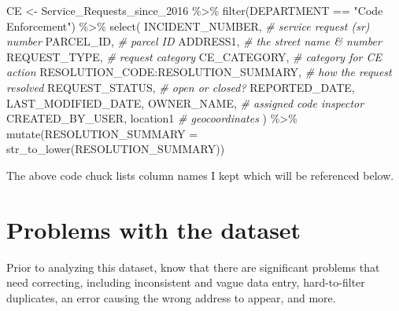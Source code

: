 \documentclass[
]{book}
\newenvironment{Shaded}{\begin{snugshade}}{\end{snugshade}}
\newcommand{\AttributeTok}[1]{\textcolor[rgb]{0.77,0.63,0.00}{#1}}
\newcommand{\CommentTok}[1]{\textcolor[rgb]{0.56,0.35,0.01}{\textit{#1}}}
\newcommand{\FunctionTok}[1]{\textcolor[rgb]{0.00,0.00,0.00}{#1}}
\newcommand{\NormalTok}[1]{#1}
\newcommand{\OtherTok}[1]{\textcolor[rgb]{0.56,0.35,0.01}{#1}}
\newcommand{\SpecialCharTok}[1]{\textcolor[rgb]{0.00,0.00,0.00}{#1}}
\newcommand{\StringTok}[1]{\textcolor[rgb]{0.31,0.60,0.02}{#1}}
\begin{document}
\begin{Shaded}
\begin{Highlighting}[]
\NormalTok{CE }\OtherTok{\textless{}{-}}\NormalTok{ Service\_Requests\_since\_2016 }\SpecialCharTok{\%\textgreater{}\%}
  \FunctionTok{filter}\NormalTok{(DEPARTMENT }\SpecialCharTok{==} \StringTok{"Code Enforcement"}\NormalTok{) }\SpecialCharTok{\%\textgreater{}\%}
  \FunctionTok{select}\NormalTok{(}
\NormalTok{    INCIDENT\_NUMBER, }\CommentTok{\#\textquotesingle{} service request (sr) number}
\NormalTok{    PARCEL\_ID, }\CommentTok{\#\textquotesingle{} parcel ID}
\NormalTok{    ADDRESS1, }\CommentTok{\#\textquotesingle{} the street name \& number}
\NormalTok{    REQUEST\_TYPE, }\CommentTok{\#\textquotesingle{} request category}
\NormalTok{    CE\_CATEGORY, }\CommentTok{\#\textquotesingle{} category for CE action}
\NormalTok{    RESOLUTION\_CODE}\SpecialCharTok{:}\NormalTok{RESOLUTION\_SUMMARY, }\CommentTok{\#\textquotesingle{} how the request resolved}
\NormalTok{    REQUEST\_STATUS, }\CommentTok{\#\textquotesingle{} open or closed?}
\NormalTok{    REPORTED\_DATE, }
\NormalTok{    LAST\_MODIFIED\_DATE, }
\NormalTok{    OWNER\_NAME, }\CommentTok{\#\textquotesingle{} assigned code inspector}
\NormalTok{    CREATED\_BY\_USER,}
\NormalTok{    location1 }\CommentTok{\#\textquotesingle{} geocoordinates}
\NormalTok{  ) }\SpecialCharTok{\%\textgreater{}\%} \FunctionTok{mutate}\NormalTok{(}\AttributeTok{RESOLUTION\_SUMMARY =} \FunctionTok{str\_to\_lower}\NormalTok{(RESOLUTION\_SUMMARY))}
\end{Highlighting}
\end{Shaded}

The above code chuck lists column names I kept which will be referenced below.

\hypertarget{problems-with-the-dataset}{%
\section{Problems with the dataset}\label{problems-with-the-dataset}}

Prior to analyzing this dataset, know that there are significant problems that need correcting, including inconsistent and vague data entry, hard-to-filter duplicates, an error causing the wrong address to appear, and more.
\end{document}
